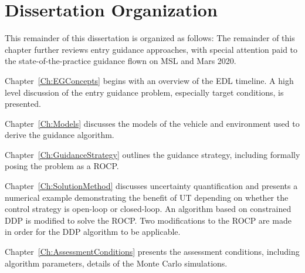 



\section{Dissertation Organization}
This remainder of this dissertation is organized as follows: The remainder of this chapter further reviews entry guidance approaches, with special attention paid to the state-of-the-practice guidance flown on MSL and Mars 2020. 

Chapter~\ref{Ch:EGConcepts} begins with an overview of the EDL timeline. A high level discussion of the entry guidance problem, especially target conditions, is presented.

Chapter~\ref{Ch:Models} discusses the models of the vehicle and environment used to derive the guidance algorithm.

Chapter~\ref{Ch:GuidanceStrategy} outlines the guidance strategy, including formally posing the problem as a ROCP.

Chapter~\ref{Ch:SolutionMethod} discusses uncertainty quantification and presents a numerical example demonstrating the benefit of UT depending on whether the control strategy is open-loop or closed-loop. An algorithm based on constrained DDP is modified to solve the ROCP. Two modifications to the ROCP are made in order for the DDP algorithm to be applicable. 

Chapter~\ref{Ch:AssessmentConditions} presents the assessment conditions, including algorithm parameters, details of the Monte Carlo simulations. 

